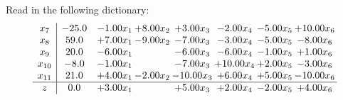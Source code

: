 \documentclass[9pt]{article}
\begin{document}
Read in the following dictionary:
\[\begin{array}{c| c c@{\hskip 2pt} c@{\hskip 2pt} c@{\hskip 2pt} c@{\hskip 2pt} c@{\hskip 2pt} c@{\hskip 2pt} }
 x_{7}   &  -25.0 & -1.00 x_{1} & +  8.00 x_{2} & +  3.00 x_{3} & -2.00 x_{4} & -5.00 x_{5} & + 10.00 x_{6}\\
 x_{8}   &  59.0 & +  7.00 x_{1} & -9.00 x_{2} & -7.00 x_{3} & -3.00 x_{4} & -5.00 x_{5} & -8.00 x_{6}\\
 x_{9}   &  20.0 & -6.00 x_{1} &   & -6.00 x_{3} & -6.00 x_{4} & -1.00 x_{5} & +  1.00 x_{6}\\
 x_{10}   &  -8.0 & -1.00 x_{1} &   & -7.00 x_{3} & + 10.00 x_{4} & +  2.00 x_{5} & -3.00 x_{6}\\
 x_{11}   &  21.0 & +  4.00 x_{1} & -2.00 x_{2} & -10.00 x_{3} & +  6.00 x_{4} & +  5.00 x_{5} & -10.00 x_{6}\\
\hline
z    &  0.0 & +  3.00 x_{1} &   & +  5.00 x_{3} & +  2.00 x_{4} & -2.00 x_{5} & +  4.00 x_{6}\\
\end{array}\]
\end{document}

